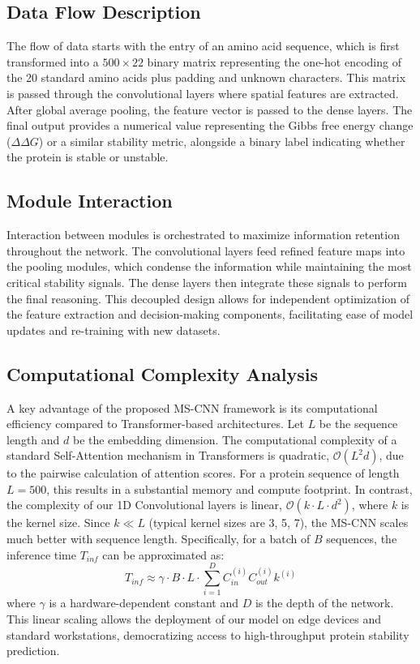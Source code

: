 \documentclass[conference]{IEEEtran}
\begin{document}
\subsection{Data Flow Description}
The flow of data starts with the entry of an amino acid sequence, which is first transformed into a $500 \times 22$ binary matrix representing the one-hot encoding of the 20 standard amino acids plus padding and unknown characters. This matrix is passed through the convolutional layers where spatial features are extracted. After global average pooling, the feature vector is passed to the dense layers. The final output provides a numerical value representing the Gibbs free energy change ($\Delta\Delta G$) or a similar stability metric, alongside a binary label indicating whether the protein is stable or unstable.

\subsection{Module Interaction}
Interaction between modules is orchestrated to maximize information retention throughout the network. The convolutional layers feed refined feature maps into the pooling modules, which condense the information while maintaining the most critical stability signals. The dense layers then integrate these signals to perform the final reasoning. This decoupled design allows for independent optimization of the feature extraction and decision-making components, facilitating ease of model updates and re-training with new datasets.

\subsection{Computational Complexity Analysis}
A key advantage of the proposed MS-CNN framework is its computational efficiency compared to Transformer-based architectures. Let $L$ be the sequence length and $d$ be the embedding dimension.
The computational complexity of a standard Self-Attention mechanism in Transformers is quadratic, $\mathcal{O}(L^2 d)$, due to the pairwise calculation of attention scores. For a protein sequence of length $L=500$, this results in a substantial memory and compute footprint.
In contrast, the complexity of our 1D Convolutional layers is linear, $\mathcal{O}(k \cdot L \cdot d^2)$, where $k$ is the kernel size. Since $k \ll L$ (typical kernel sizes are 3, 5, 7), the MS-CNN scales much better with sequence length. 
Specifically, for a batch of $B$ sequences, the inference time $T_{inf}$ can be approximated as:
\begin{equation}
T_{inf} \approx \gamma \cdot B \cdot L \cdot \sum_{i=1}^{D} C_{in}^{(i)} C_{out}^{(i)} k^{(i)}
\end{equation}
where $\gamma$ is a hardware-dependent constant and $D$ is the depth of the network. This linear scaling allows the deployment of our model on edge devices and standard workstations, democratizing access to high-throughput protein stability prediction.
\end{document}
